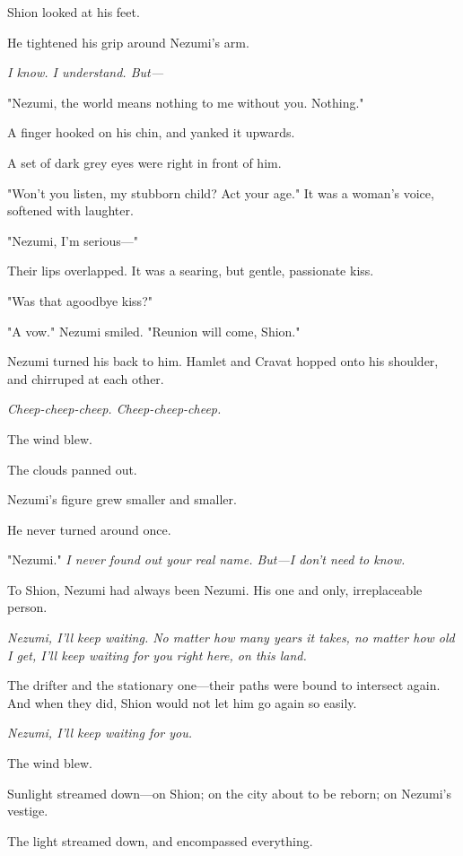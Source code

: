 Shion looked at his feet.

He tightened his grip around Nezumi's arm.

\emph{I know. I understand. But---}

"Nezumi, the world means nothing to me without you. Nothing."

A finger hooked on his chin, and yanked it upwards.

A set of dark grey eyes were right in front of him.

"Won't you listen, my stubborn child? Act your age." It was a woman's
voice, softened with laughter.

"Nezumi, I'm serious---"

Their lips overlapped. It was a searing, but gentle, passionate kiss.

"Was that a\el goodbye kiss?"

"A vow." Nezumi smiled. "Reunion will come, Shion."

Nezumi turned his back to him. Hamlet and Cravat hopped onto his
shoulder, and chirruped at each other.

\emph{Cheep-cheep-cheep. Cheep-cheep-cheep.}

The wind blew.

The clouds panned out.

Nezumi's figure grew smaller and smaller.

He never turned around once.

"Nezumi." \emph{I never found out your real name. But---I don't need to know.}

To Shion, Nezumi had always been Nezumi. His one and only, irreplaceable
person.

\emph{Nezumi, I'll keep waiting. No matter how many years it takes, no matter
how old I get, I'll keep waiting for you right here, on this land.}

The drifter and the stationary one---their paths were bound to intersect
again. And when they did, Shion would not let him go again so easily.

\emph{Nezumi, I'll keep waiting for you.}

\mybreak

The wind blew.

Sunlight streamed down---on Shion; on the city about to be reborn; on
Nezumi's vestige.

The light streamed down, and encompassed everything.